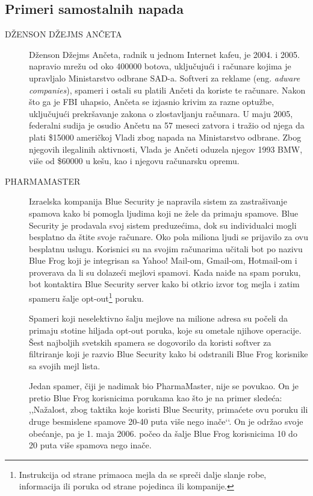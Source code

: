 \documentclass[a4paper]{article}
\theoremstyle{break}
\begin{document}
{\subsection{Primeri samostalnih napada}
\label{subsec:primeri_samo_napada}

\begin{description}
\item[DŽENSON DŽEJMS ANČETA] Dženson Džejms Ančeta, radnik u jednom Internet kafeu, je 2004. i 2005. napravio mrežu od oko 400000 botova, uključujući i računare kojima je upravljalo Ministarstvo odbrane SAD-a. Softveri za reklame (eng. {\em adware companies}), spameri i ostali su platili Ančeti da koriste te računare. Nakon što ga je FBI uhapsio, Ančeta se izjasnio krivim za razne optužbe, uključujući prekršavanje zakona o zlostavljanju računara. U maju 2005, federalni sudija je osudio Ančetu na 57 meseci zatvora i tražio od njega da plati \$15000 američkoj Vladi zbog napada na Ministarstvo odbrane. Zbog njegovih ilegalinih aktivnosti, Vlada je Ančeti oduzela njegov 1993 BMW, više od \$60000 u kešu, kao i njegovu računarsku opremu.


\item[PHARMAMASTER] Izraelska kompanija Blue Security je napravila sistem za zastrašivanje spamova kako bi pomogla ljudima koji ne žele da primaju spamove. Blue Security je prodavala svoj sistem preduzećima, dok su individualci mogli besplatno da štite svoje računare. Oko pola miliona ljudi se prijavilo za ovu besplatnu uslugu. Korisnici su na svojim računarima učitali bot po nazivu Blue Frog koji je integrisan sa Yahoo! Mail-om, Gmail-om, Hotmail-om i proverava da li su dolazeći mejlovi spamovi. Kada naiđe na spam poruku, bot kontaktira Blue Security server kako bi otkrio izvor tog mejla i zatim spameru šalje opt-out\footnote{Instrukcija od strane primaoca mejla da se spreči dalje slanje robe, informacija ili poruka od strane pojedinca ili kompanije.} poruku.

Spameri koji neselektivno šalju mejlove na milione adresa su počeli da primaju stotine hiljada opt-out poruka, koje su ometale njihove operacije. Šest najboljih svetskih spamera se dogovorilo da koristi softver za filtriranje koji je razvio Blue Security kako bi odstranili Blue Frog korisnike sa svojih mejl lista.

Jedan spamer, čiji je nadimak bio PharmaMaster, nije se povukao. On je pretio Blue Frog korisnicima porukama kao što je na primer sledeća: ,,Nažalost, zbog taktika koje koristi Blue Security, primaćete ovu poruku ili druge besmislene spamove 20-40 puta više nego inače‘‘. On je održao svoje obećanje, pa je 1. maja 2006. počeo da šalje Blue Frog korisnicima 10 do 20 puta više spamova nego inače.


\end{description}}
\end{document}
